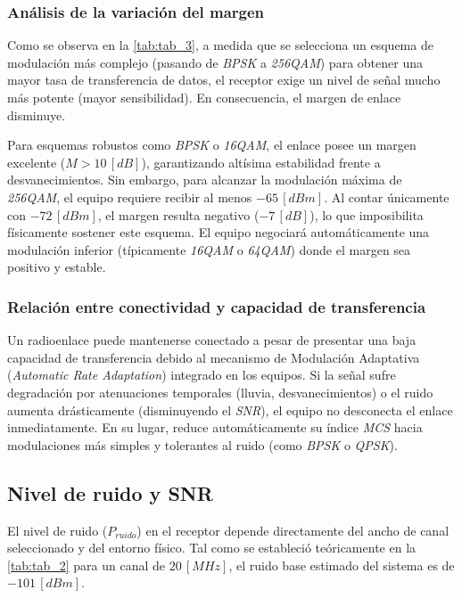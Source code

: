 \subsubsection{Análisis de la variación del margen}
\label{sec_2.13.1}
Como se observa en la \autoref{tab:tab_3}, a medida que se selecciona un esquema de modulación más complejo (pasando de \textit{BPSK} a \textit{256QAM}) para obtener una mayor tasa de transferencia de datos, el receptor exige un nivel de señal mucho más potente (mayor sensibilidad). En consecuencia, el margen de enlace disminuye. 

Para esquemas robustos como \textit{BPSK} o \textit{16QAM}, el enlace posee un margen excelente ($M > 10 \, [dB]$), garantizando altísima estabilidad frente a desvanecimientos. Sin embargo, para alcanzar la modulación máxima de \textit{256QAM}, el equipo requiere recibir al menos $-65 \, [dBm]$. Al contar únicamente con $-72 \, [dBm]$, el margen resulta negativo ($-7 \, [dB]$), lo que imposibilita físicamente sostener este esquema. El equipo negociará automáticamente una modulación inferior (típicamente \textit{16QAM} o \textit{64QAM}) donde el margen sea positivo y estable.


\subsubsection{Relación entre conectividad y capacidad de transferencia}
\label{sec_2.13.2}
Un radioenlace puede mantenerse conectado a pesar de presentar una baja capacidad de transferencia debido al mecanismo de Modulación Adaptativa (\textit{Automatic Rate Adaptation}) integrado en los equipos. Si la señal sufre degradación por atenuaciones temporales (lluvia, desvanecimientos) o el ruido aumenta drásticamente (disminuyendo el \textit{SNR}), el equipo no desconecta el enlace inmediatamente. En su lugar, reduce automáticamente su índice \textit{MCS} hacia modulaciones más simples y tolerantes al ruido (como \textit{BPSK} o \textit{QPSK}).



\subsection{Nivel de ruido y SNR}
\label{sec_2.14}
El nivel de ruido ($P_{ruido}$) en el receptor depende directamente del ancho de canal seleccionado y del entorno físico. Tal como se estableció teóricamente en la \autoref{tab:tab_2} para un canal de $20 \, [MHz]$, el ruido base estimado del sistema es de $-101 \, [dBm]$.

